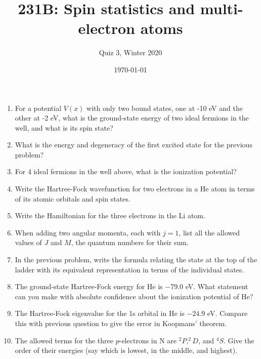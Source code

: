 




\title{231B: Spin statistics and multi-electron atoms}
\author{Quiz 3, Winter 2020}
\date{\today}
\maketitle

\begin{enumerate}

\item For a potential $V(x)$ with only two bound states, one at -10 eV
and the other at -2 eV, what is the ground-state energy of two ideal
fermions in the well, and what is its spin state?

\item What is the energy and degeneracy of the first excited state for the previous
problem?

\item For 4 ideal fermions in the well above, what is the ionization potential?

\item Write the Hartree-Fock wavefunction for two electrons in a He atom in terms
of its atomic orbitals and spin states.

\item Write the Hamiltonian for the three electrons in the Li atom.

\item When adding two angular momenta, each with $j=1$, list all the allowed
values of $J$ and $M$, the quantum numbers for their sum.

\item In the previous problem, write the formula relating the state at the top
of the ladder with its equivalent representation in terms of the individual states.

\item The ground-state Hartree-Fock energy for He is $-79.0$ eV.  What statement can
you make with absolute confidence about the ionization potential of He?

\item The Hartree-Fock eigenvalue for the 1s orbital in He is $-24.9$ eV.  Compare
this with previous question to give the error in Koopmans' theorem.

\item The allowed terms for the three $p$-electrons in N are $^2P, ^2D$, and $^4S$.
Give the order of their energies (say which is lowest, in the middle, and highest).


\end{enumerate}

